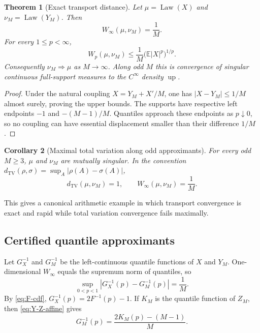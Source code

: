\documentclass[11pt,oneside]{article}
\newtheorem{theorem}{Theorem}[section]
\newtheorem{corollary}[theorem]{Corollary}
\theoremstyle{definition}
\theoremstyle{remark}
\newcommand{\Up}{\operatorname{up}}
\numberwithin{equation}{section}
\newcommand{\Law}{\operatorname{Law}}
\newcommand{\TV}{\operatorname{TV}}
\newcommand{\1}{\mathbf 1}
\begin{document}
\begin{theorem}[Exact transport distance]
\label{thm:Winfty}
Let $\mu=\Law(X)$ and $\nu_M=\Law(Y_M)$.  Then
\begin{equation}
 W_\infty(\mu,\nu_M)=\frac1M.
 \label{eq:Winfty-exact}
\end{equation}
For every $1\le p<\infty$,
\begin{equation}
 W_p(\mu,\nu_M)
 \le\frac1M\bigl(\mathbb E|X|^p\bigr)^{1/p}.
 \label{eq:Wp-bound}
\end{equation}
Consequently $\nu_M\Rightarrow\mu$ as $M\to\infty$.  Along odd $M$ this is convergence
of singular continuous full-support measures to the $C^\infty$ density $\Up$.
\end{theorem}

\begin{proof}
Under the natural coupling $X=Y_M+X'/M$, one has $|X-Y_M|\le1/M$ almost surely, proving
the upper bounds.  The supports have respective left endpoints $-1$ and
$-(M-1)/M$.  Quantiles approach these endpoints as $p\downarrow0$, so no coupling can
have essential displacement smaller than their difference $1/M$.
\end{proof}

\begin{corollary}[Maximal total variation along odd approximants]
\label{cor:TV}
For every odd $M\ge3$, $\mu$ and $\nu_M$ are mutually singular.  In the convention
$d_{\TV}(\rho,\sigma)=\sup_A|\rho(A)-\sigma(A)|$,
\begin{equation}
 d_{\TV}(\mu,\nu_M)=1,
 \qquad
 W_\infty(\mu,\nu_M)=\frac1M.
 \label{eq:TV-Wcontrast}
\end{equation}
\end{corollary}

This gives a canonical arithmetic example in which transport convergence is exact and
rapid while total variation convergence fails maximally.

\subsection{Certified quantile approximants}

Let $G_X^{-1}$ and $G_M^{-1}$ be the left-continuous quantile functions of $X$ and $Y_M$.
One-dimensional $W_\infty$ equals the supremum norm of quantiles, so
\begin{equation}
 \sup_{0<p<1}|G_X^{-1}(p)-G_M^{-1}(p)|=\frac1M.
 \label{eq:quantile-W}
\end{equation}
By \eqref{eq:F-cdf}, $G_X^{-1}(p)=2F^{-1}(p)-1$.  If $K_M$ is the quantile function of
$Z_M$, then \eqref{eq:Y-Z-affine} gives
\[
 G_M^{-1}(p)=\frac{2K_M(p)-(M-1)}{M}.
\]
\end{document}
